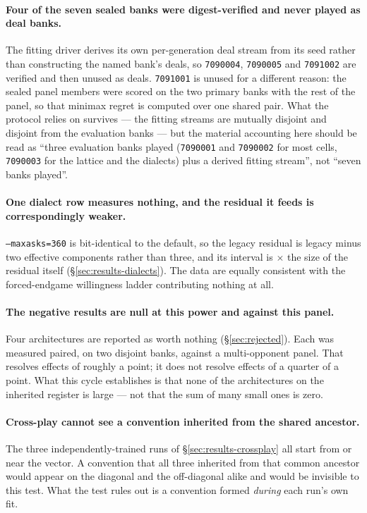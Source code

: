 \paragraph{Four of the seven sealed banks were digest-verified and never played as deal banks.}
The fitting driver derives its own per-generation deal stream from its seed rather than constructing
the named bank's deals, so \texttt{7090004}, \texttt{7090005} and \texttt{7091002} are verified and
then unused as deals. \texttt{7091001} is unused for a different reason: the sealed panel members
were scored on the two primary banks with the rest of the panel, so that minimax regret is computed
over one shared pair. What the protocol relies on survives --- the fitting streams are mutually
disjoint and disjoint from the evaluation banks --- but the material accounting here should be read
as ``three evaluation banks played (\texttt{7090001} and \texttt{7090002} for most cells,
\texttt{7090003} for the lattice and the dialects) plus a derived fitting stream'', not ``seven
banks played''.

\paragraph{One dialect row measures nothing, and the residual it feeds is correspondingly weaker.}
\texttt{--maxasks=360} is bit-identical to the default, so the legacy residual is legacy minus two
effective components rather than three, and its interval is \vsevenLegacyResidualRatio$\times$ the size
of the residual itself (\S\ref{sec:results-dialects}). The data are equally consistent with the
forced-endgame willingness ladder contributing nothing at all.

\paragraph{The negative results are null at this power and against this panel.}
Four architectures are reported as worth nothing (\S\ref{sec:rejected}). Each was measured paired, on
two disjoint banks, against a multi-opponent panel. That resolves effects of roughly a point; it does
not resolve effects of a quarter of a point. What this cycle establishes is that none of the
architectures on the inherited register is large --- not that the sum of many small ones is zero.

\paragraph{Cross-play cannot see a convention inherited from the shared ancestor.}
The three independently-trained runs of \S\ref{sec:results-crossplay} all start from or near the
\vsix{} vector. A convention that all three inherited from that common ancestor would appear on the
diagonal and the off-diagonal alike and would be invisible to this test. What the test rules out is a
convention formed \emph{during} each run's own fit.


